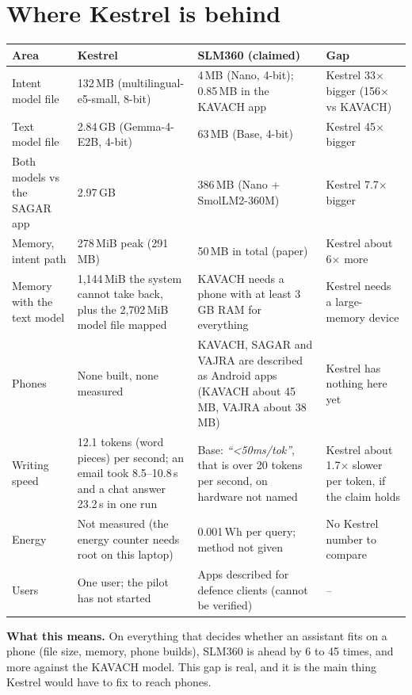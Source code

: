 \documentclass[11pt,a4paper]{article}
\newcommand{\quoted}[1]{\textit{``#1''}}
\begin{document}
\section{Where Kestrel is behind}

\begin{center}
\begin{tabularx}{\textwidth}{@{}P{3.1cm}LLP{2.6cm}@{}}
\toprule
\textbf{Area} & \textbf{Kestrel} & \textbf{SLM360 (claimed)} & \textbf{Gap} \\
\midrule
Intent model file & 132\,MB (multilingual-e5-small, 8-bit) & 4\,MB (Nano, 4-bit); 0.85\,MB in the KAVACH app &
Kestrel 33$\times$ bigger (156$\times$ vs KAVACH) \\
Text model file & 2.84\,GB (Gemma-4-E2B, 4-bit) & 63\,MB (Base, 4-bit) & Kestrel 45$\times$ bigger \\
Both models vs the SAGAR app & 2.97\,GB & 386\,MB (Nano + SmolLM2-360M) & Kestrel 7.7$\times$ bigger \\
Memory, intent path & 278\,MiB peak (291\,MB) & 50\,MB in total (paper) & Kestrel about 6$\times$ more \\
Memory with the text model & 1,144\,MiB the system cannot take back, plus the 2,702\,MiB model file mapped & KAVACH
needs a phone with at least 3\,GB RAM for everything & Kestrel needs a large-memory device \\
Phones & None built, none measured & KAVACH, SAGAR and VAJRA are described as Android apps (KAVACH about 45\,MB,
VAJRA about 38\,MB) & Kestrel has nothing here yet \\
Writing speed & 12.1 tokens (word pieces) per second; an email took 8.5--10.8\,s and a chat answer 23.2\,s in one run
& Base: \quoted{<50ms/tok}, that is over 20 tokens per second, on hardware not named & Kestrel about 1.7$\times$
slower per token, if the claim holds \\
Energy & Not measured (the energy counter needs root on this laptop) & 0.001\,Wh per query; method not given & No
Kestrel number to compare \\
Users & One user; the pilot has not started & Apps described for defence clients (cannot be verified) & -- \\
\bottomrule
\end{tabularx}
\end{center}

\noindent\textbf{What this means.} On everything that decides whether an assistant fits on a phone (file size, memory,
phone builds), SLM360 is ahead by 6 to 45 times, and more against the KAVACH model. This gap is real, and it is the
main thing Kestrel would have to fix to reach phones.
\end{document}
